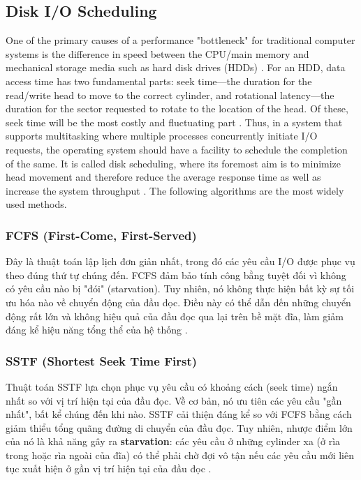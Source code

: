 \documentclass[12pt]{article}
\begin{document}
\subsection{Disk I/O Scheduling}

One of the primary causes of a performance "bottleneck" for traditional computer systems is the difference in speed between the CPU/main memory and mechanical storage media such as hard disk drives (HDDs) \parencite{Pokharel2021}. For an HDD, data access time has two fundamental parts: seek time—the duration for the read/write head to move to the correct cylinder, and rotational latency—the duration for the sector requested to rotate to the location of the head. Of these, seek time will be the most costly and fluctuating part \parencite{KansalDiskScheduling}. Thus, in a system that supports multitasking where multiple processes concurrently initiate I/O requests, the operating system should have a facility to schedule the completion of the same. It is called disk scheduling, where its foremost aim is to minimize head movement and therefore reduce the average response time as well as increase the system throughput \parencite{GeeksForGeeks2025IO}. The following algorithms are the most widely used methods.

\subsubsection{FCFS (First-Come, First-Served)}
Đây là thuật toán lập lịch đơn giản nhất, trong đó các yêu cầu I/O được phục vụ theo đúng thứ tự chúng đến. FCFS đảm bảo tính công bằng tuyệt đối vì không có yêu cầu nào bị "đói" (starvation). Tuy nhiên, nó không thực hiện bất kỳ sự tối ưu hóa nào về chuyển động của đầu đọc. Điều này có thể dẫn đến những chuyển động rất lớn và không hiệu quả của đầu đọc qua lại trên bề mặt đĩa, làm giảm đáng kể hiệu năng tổng thể của hệ thống \parencite{GeeksForGeeks2025IO}.

\subsubsection{SSTF (Shortest Seek Time First)}
Thuật toán SSTF lựa chọn phục vụ yêu cầu có khoảng cách (seek time) ngắn nhất so với vị trí hiện tại của đầu đọc. Về cơ bản, nó ưu tiên các yêu cầu "gần nhất", bất kể chúng đến khi nào. SSTF cải thiện đáng kể so với FCFS bằng cách giảm thiểu tổng quãng đường di chuyển của đầu đọc. Tuy nhiên, nhược điểm lớn của nó là khả năng gây ra \textbf{starvation}: các yêu cầu ở những cylinder xa (ở rìa trong hoặc rìa ngoài của đĩa) có thể phải chờ đợi vô tận nếu các yêu cầu mới liên tục xuất hiện ở gần vị trí hiện tại của đầu đọc \parencite{GeeksForGeeks2025IO, KansalDiskScheduling}.
\end{document}
